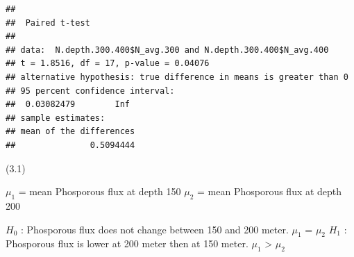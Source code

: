 \documentclass[]{article}
\newenvironment{Shaded}{\begin{snugshade}}{\end{snugshade}}
\newcommand{\DataTypeTok}[1]{\textcolor[rgb]{0.13,0.29,0.53}{#1}}
\newcommand{\FloatTok}[1]{\textcolor[rgb]{0.00,0.00,0.81}{#1}}
\newcommand{\KeywordTok}[1]{\textcolor[rgb]{0.13,0.29,0.53}{\textbf{#1}}}
\newcommand{\NormalTok}[1]{#1}
\newcommand{\OperatorTok}[1]{\textcolor[rgb]{0.81,0.36,0.00}{\textbf{#1}}}
\newcommand{\OtherTok}[1]{\textcolor[rgb]{0.56,0.35,0.01}{#1}}
\newcommand{\StringTok}[1]{\textcolor[rgb]{0.31,0.60,0.02}{#1}}
\begin{document}
\begin{Shaded}
\end{Shaded}

\begin{verbatim}
## 
##  Paired t-test
## 
## data:  N.depth.300.400$N_avg.300 and N.depth.300.400$N_avg.400
## t = 1.8516, df = 17, p-value = 0.04076
## alternative hypothesis: true difference in means is greater than 0
## 95 percent confidence interval:
##  0.03082479        Inf
## sample estimates:
## mean of the differences 
##               0.5094444
\end{verbatim}

(3.1)

\(\mu_1\) = mean Phosporous flux at depth 150 \(\mu_2\) = mean
Phosporous flux at depth 200

\(H_0\) : Phosporous flux does not change between 150 and 200 meter.
\(\mu_1\) = \(\mu_2\) \(H_1\) : Phosporous flux is lower at 200 meter
then at 150 meter. \(\mu_1\) \textgreater{} \(\mu_2\)

\begin{Shaded}
\end{Shaded}
\end{document}
